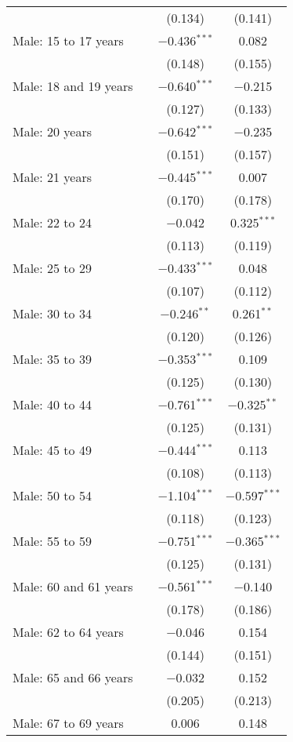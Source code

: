 \begin{longtable}{@{\extracolsep{5pt}}lccc}
  &  & (0.134) & (0.141) \\ 
  Male: 15 to 17 years &  & $-$0.436$^{***}$ & 0.082 \\ 
  &  & (0.148) & (0.155) \\ 
  Male: 18 and 19 years &  & $-$0.640$^{***}$ & $-$0.215 \\ 
  &  & (0.127) & (0.133) \\ 
  Male: 20 years &  & $-$0.642$^{***}$ & $-$0.235 \\ 
  &  & (0.151) & (0.157) \\ 
  Male: 21 years &  & $-$0.445$^{***}$ & 0.007 \\ 
  &  & (0.170) & (0.178) \\ 
  Male: 22 to 24 &  & $-$0.042 & 0.325$^{***}$ \\ 
  &  & (0.113) & (0.119) \\ 
  Male: 25 to 29 &  & $-$0.433$^{***}$ & 0.048 \\ 
  &  & (0.107) & (0.112) \\ 
  Male: 30 to 34 &  & $-$0.246$^{**}$ & 0.261$^{**}$ \\ 
  &  & (0.120) & (0.126) \\ 
  Male: 35 to 39 &  & $-$0.353$^{***}$ & 0.109 \\ 
  &  & (0.125) & (0.130) \\ 
  Male: 40 to 44 &  & $-$0.761$^{***}$ & $-$0.325$^{**}$ \\ 
  &  & (0.125) & (0.131) \\ 
  Male: 45 to 49 &  & $-$0.444$^{***}$ & 0.113 \\ 
  &  & (0.108) & (0.113) \\ 
  Male: 50 to 54 &  & $-$1.104$^{***}$ & $-$0.597$^{***}$ \\ 
  &  & (0.118) & (0.123) \\ 
  Male: 55 to 59 &  & $-$0.751$^{***}$ & $-$0.365$^{***}$ \\ 
  &  & (0.125) & (0.131) \\ 
  Male: 60 and 61 years &  & $-$0.561$^{***}$ & $-$0.140 \\ 
  &  & (0.178) & (0.186) \\ 
  Male: 62 to 64 years &  & $-$0.046 & 0.154 \\ 
  &  & (0.144) & (0.151) \\ 
  Male: 65 and 66 years &  & $-$0.032 & 0.152 \\ 
  &  & (0.205) & (0.213) \\ 
  Male: 67 to 69 years &  & 0.006 & 0.148 \\ 

\end{longtable}
